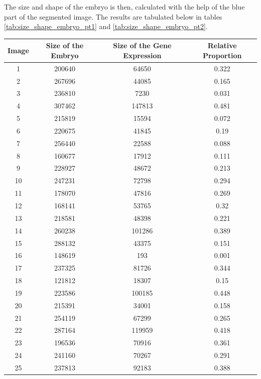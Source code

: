 \documentclass{article}
\begin{document}
The size and shape of the embryo is then, calculated with the help of the blue part of the segmented image. The results are tabulated below in tables \ref{tab:size_shape_embryo_pt1} and \ref{tab:size_shape_embryo_pt2}.
\begin{table}[h!]
    \centering
    \begin{tabular}{|c|c|c|c|}
    \hline
    Image & Size of the Embryo & Size of the Gene Expression & Relative Proportion \\  \hline
    1 & 200640 & 64650 & 0.322 \\     \hline
    2 & 267696 & 44085 & 0.165 \\    \hline
    3 & 236810 & 7230 & 0.031 \\    \hline
    4 & 307462 & 147813 & 0.481 \\    \hline
    5 & 215819 & 15594 & 0.072 \\    \hline
    6 & 220675 & 41845 & 0.19  \\    \hline
    7 & 256440 & 22588 & 0.088  \\    \hline
    8 & 160677 & 17912 & 0.111  \\    \hline
    9 & 228927 & 48672 & 0.213  \\    \hline
    10 & 247231 & 72798 & 0.294  \\    \hline
    11 & 178070 & 47816 & 0.269  \\    \hline
    12 & 168141 & 53765 & 0.32  \\    \hline
    13 & 218581 & 48398 & 0.221  \\ \hline
    14 & 260238 & 101286 & 0.389 \\    \hline
    15 & 288132 & 43375 & 0.151 \\    \hline
    16 & 148619 & 193 & 0.001 \\    \hline
    17 & 237325 & 81726 & 0.344 \\    \hline
    18 & 121812 & 18307 & 0.15 \\    \hline
    19 & 223586 & 100185 & 0.448 \\    \hline
    20 & 215391 & 34001 & 0.158 \\    \hline
    21 & 254119 & 67299 & 0.265 \\    \hline
    22 & 287164 & 119959 & 0.418 \\\hline
    23 & 196536 & 70916 & 0.361 \\    \hline
    24 & 241160 & 70267 & 0.291 \\    \hline
    25 & 237813 & 92183 & 0.388 \\    \hline

\end{tabular}
\end{table}
\end{document}
